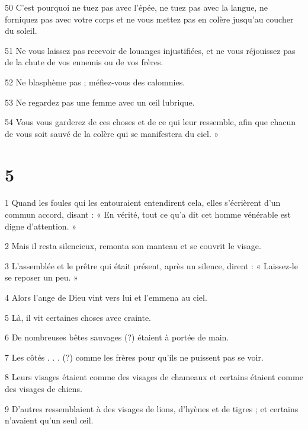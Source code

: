 \par 50 C'est pourquoi ne tuez pas avec l'épée, ne tuez pas avec la langue, ne forniquez pas avec votre corps et ne vous mettez pas en colère jusqu'au coucher du soleil.

\par 51 Ne vous laissez pas recevoir de louanges injustifiées, et ne vous réjouissez pas de la chute de vos ennemis ou de vos frères.

\par 52 Ne blasphème pas ; méfiez-vous des calomnies.

\par 53 Ne regardez pas une femme avec un œil lubrique.

\par 54 Vous vous garderez de ces choses et de ce qui leur ressemble, afin que chacun de vous soit sauvé de la colère qui se manifestera du ciel. »

\chapter{5}

\par 1 Quand les foules qui les entouraient entendirent cela, elles s'écrièrent d'un commun accord, disant : « En vérité, tout ce qu'a dit cet homme vénérable est digne d'attention. »

\par 2 Mais il resta silencieux, remonta son manteau et se couvrit le visage.

\par 3 L'assemblée et le prêtre qui était présent, après un silence, dirent : « Laissez-le se reposer un peu. »

\par 4 Alors l'ange de Dieu vint vers lui et l'emmena au ciel.

\par 5 Là, il vit certaines choses avec crainte.

\par 6 De nombreuses bêtes sauvages (?) étaient à portée de main.

\par 7 Les côtés . . . (?) comme les frères pour qu'ils ne puissent pas se voir.

\par 8 Leurs visages étaient comme des visages de chameaux et certains étaient comme des visages de chiens.

\par 9 D'autres ressemblaient à des visages de lions, d'hyènes et de tigres ; et certains n'avaient qu'un seul œil.

